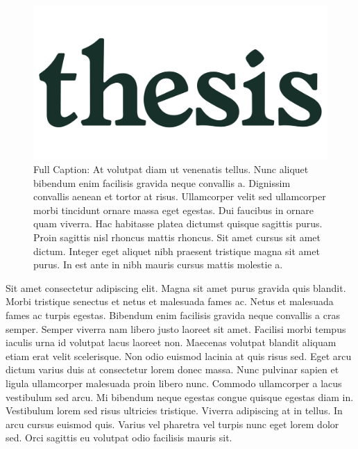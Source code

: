 \begin{figure}[t]
	\begin{center}
		\includegraphics[width=\textwidth]{./media/image1.jpg}
	\end{center}
	\caption[Content figure caption]{Full Caption: At volutpat diam ut venenatis tellus. Nunc aliquet bibendum enim facilisis gravida neque convallis a. Dignissim convallis aenean et tortor at risus. Ullamcorper velit sed ullamcorper morbi tincidunt ornare massa eget egestas. Dui faucibus in ornare quam viverra. Hac habitasse platea dictumst quisque sagittis purus. Proin sagittis nisl rhoncus mattis rhoncus. Sit amet cursus sit amet dictum. Integer eget aliquet nibh praesent tristique magna sit amet purus. In est ante in nibh mauris cursus mattis molestie a.
	}
	\label{fig:intro_fig_1}
\end{figure}



Sit amet consectetur adipiscing elit. Magna sit amet purus gravida quis blandit. Morbi tristique senectus et netus et malesuada fames ac. Netus et malesuada fames ac turpis egestas. Bibendum enim facilisis gravida neque convallis a cras semper. Semper viverra nam libero justo laoreet sit amet. Facilisi morbi tempus iaculis urna id volutpat lacus laoreet non. Maecenas volutpat blandit aliquam etiam erat velit scelerisque. Non odio euismod lacinia at quis risus sed. Eget arcu dictum varius duis at consectetur lorem donec massa. Nunc pulvinar sapien et ligula ullamcorper malesuada proin libero nunc. Commodo ullamcorper a lacus vestibulum sed arcu. Mi bibendum neque egestas congue quisque egestas diam in. Vestibulum lorem sed risus ultricies tristique. Viverra adipiscing at in tellus. In arcu cursus euismod quis. Varius vel pharetra vel turpis nunc eget lorem dolor sed. Orci sagittis eu volutpat odio facilisis mauris sit.

